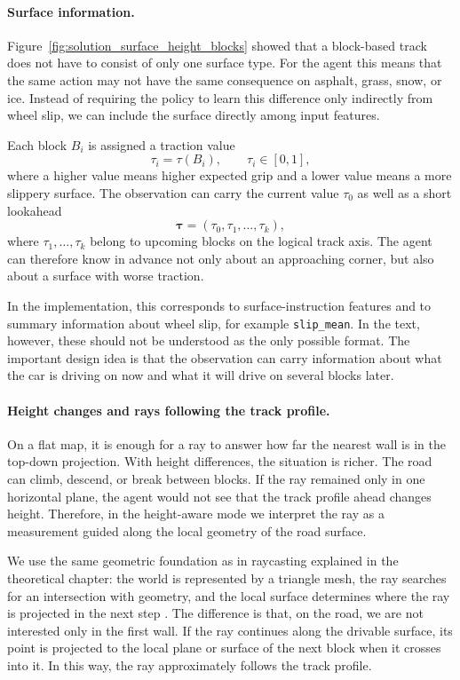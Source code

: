 \paragraph{Surface information.}
Figure~\ref{fig:solution_surface_height_blocks} showed that a block-based track does not have to consist of only one surface type. For the agent this means that the same action may not have the same consequence on asphalt, grass, snow, or ice. Instead of requiring the policy to learn this difference only indirectly from wheel slip, we can include the surface directly among input features.

Each block \(B_i\) is assigned a traction value
\[
    \tau_i = \tau(B_i), \qquad \tau_i \in [0,1],
\]
where a higher value means higher expected grip and a lower value means a more slippery surface. The observation can carry the current value \(\tau_0\) as well as a short lookahead
\[
    \boldsymbol{\tau}
    =
    (\tau_0, \tau_1, \ldots, \tau_k),
\]
where \(\tau_1,\ldots,\tau_k\) belong to upcoming blocks on the logical track axis. The agent can therefore know in advance not only about an approaching corner, but also about a surface with worse traction.

In the implementation, this corresponds to surface-instruction features and to summary information about wheel slip, for example \texttt{slip\_mean}. In the text, however, these should not be understood as the only possible format. The important design idea is that the observation can carry information about what the car is driving on now and what it will drive on several blocks later.

\paragraph{Height changes and rays following the track profile.}
On a flat map, it is enough for a ray to answer how far the nearest wall is in the top-down projection. With height differences, the situation is richer. The road can climb, descend, or break between blocks. If the ray remained only in one horizontal plane, the agent would not see that the track profile ahead changes height. Therefore, in the height-aware mode we interpret the ray as a measurement guided along the local geometry of the road surface.

We use the same geometric foundation as in raycasting explained in the theoretical chapter: the world is represented by a triangle mesh, the ray searches for an intersection with geometry, and the local surface determines where the ray is projected in the next step \cite{hughes2014computer_graphics, dunn2011mathprimer, moller1997raytriangle}. The difference is that, on the road, we are not interested only in the first wall. If the ray continues along the drivable surface, its point is projected to the local plane or surface of the next block when it crosses into it. In this way, the ray approximately follows the track profile.

